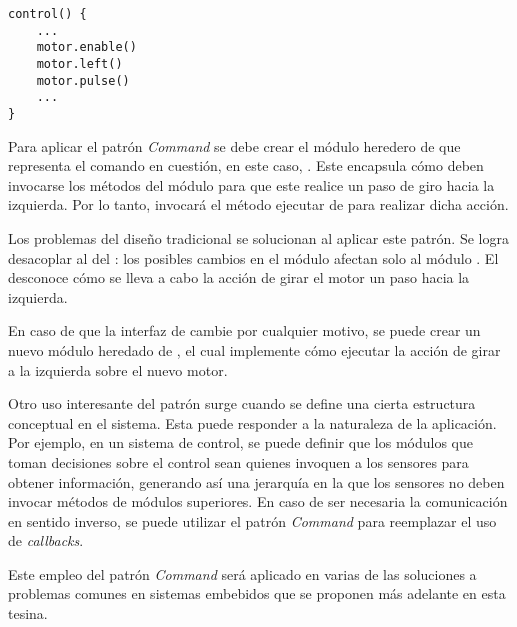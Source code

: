 \begin{lstlisting}[label={notCommand}, caption=Ejemplo de implementación sin usar el patrón \textit{Command}.]
control() {
    ...
    motor.enable()
    motor.left()
    motor.pulse()
    ... 
}
\end{lstlisting}
Para aplicar el patrón \textit{Command} se debe crear el módulo heredero de \Orden que representa el comando en cuestión, en este caso, \MotorGirarIzq. Este encapsula cómo deben invocarse los métodos del módulo \Motor para que este realice un paso de giro hacia la izquierda. Por lo tanto, \Controller invocará el método ejecutar de \MotorGirarIzq para realizar dicha acción.

Los problemas del diseño tradicional se solucionan al aplicar este patrón. Se logra desacoplar al \Motor del \Controller: los posibles cambios en el módulo \Motor afectan solo al módulo \MotorGirarIzq. El \Controller desconoce cómo se lleva a cabo la acción de girar el motor un paso hacia la izquierda.

En caso de que la interfaz de \Motor cambie por cualquier motivo, se puede crear un nuevo módulo heredado de \Orden, el cual implemente cómo ejecutar la acción de girar a la izquierda sobre el nuevo motor.

Otro uso interesante del patrón surge cuando se define una cierta estructura conceptual en el sistema. Esta puede responder a la naturaleza de la aplicación. Por ejemplo, en un sistema de control, se puede definir que los módulos que toman decisiones sobre el control sean quienes invoquen a los sensores para obtener información, generando así una jerarquía en la que los sensores no deben invocar métodos de módulos superiores. En caso de ser necesaria la comunicación en sentido inverso, se puede utilizar el patrón \textit{Command} para reemplazar el uso de \textit{callbacks}.

Este empleo del patrón \textit{Command} será aplicado en varias de las soluciones a problemas comunes en sistemas embebidos que se proponen más adelante en esta tesina.